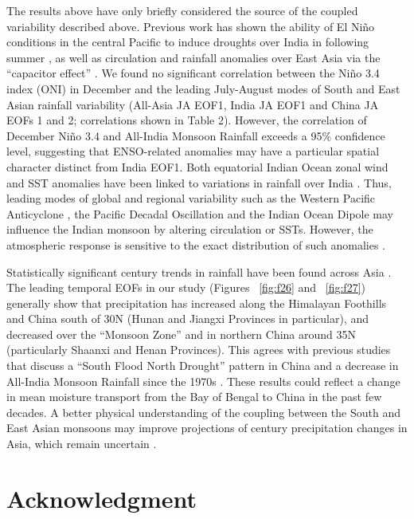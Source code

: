 	The results above have only briefly considered the source of the coupled variability described above. Previous work has shown the ability of El Ni\~no conditions in the central Pacific to induce droughts over India in following summer \citep{Kumar2006}, as well as circulation and rainfall anomalies over East Asia via the ``capacitor effect'' \citep{Xie2009}. We found no significant correlation between the Ni\~no 3.4 index (ONI) in December and the leading July-August modes of South and East Asian rainfall variability (All-Asia JA EOF1, India JA EOF1 and China JA EOFs 1 and 2; correlations shown in Table 2). However, the correlation of December Ni\~no 3.4 and All-India Monsoon Rainfall exceeds a 95\% confidence level, suggesting that ENSO-related anomalies may have a particular spatial character distinct from India EOF1. Both equatorial Indian Ocean zonal wind and SST anomalies have been linked to variations in rainfall over India \citep{Ihara2007,Mishra2012}. Thus, leading modes of global and regional variability such as the Western Pacific Anticyclone \citep{Kosaka2011}, the Pacific Decadal Oscillation \citep{Mantua2002} and the Indian Ocean Dipole \citep{Saji1999} may influence the Indian monsoon by altering circulation or SSTs. However, the atmospheric response is sensitive to the exact distribution of such anomalies \citep{Xie2009}.
	
	Statistically significant  century trends in rainfall have been found across Asia \citep{Christensen2011,Singh2014}. The leading temporal EOFs in our study (Figures ~\ref{fig:f26} and ~\ref{fig:f27}) generally show that precipitation has increased along the Himalayan Foothills and China south of 30\textdegree N (Hunan and Jiangxi Provinces in particular), and decreased over the ``Monsoon Zone'' and in northern China around 35\textdegree N (particularly Shaanxi and Henan Provinces). This agrees with previous studies that discuss a ``South Flood North Drought'' pattern in China \citep{Ding2008} and a decrease in All-India Monsoon Rainfall since the 1970s \citep{Annamalai2013}. These results could reflect a change in mean moisture transport from the Bay of Bengal to China in the past few decades. A better physical understanding of the coupling between the South and East Asian monsoons may improve projections of  century precipitation changes in Asia, which remain uncertain \citep{Christensen2011}.	 
	 
\section{Acknowledgment} 

